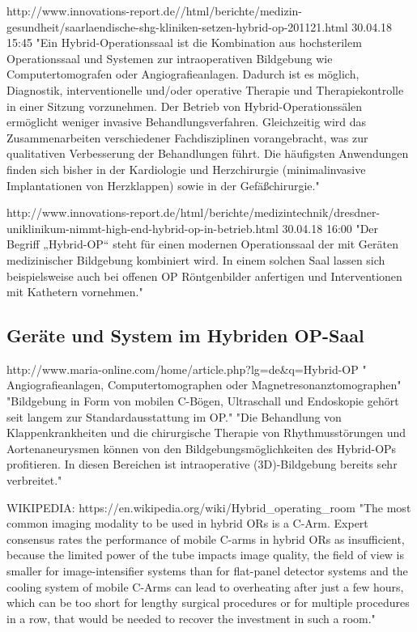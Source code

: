 http://www.innovations-report.de//html/berichte/medizin-gesundheit/saarlaendische-shg-kliniken-setzen-hybrid-op-201121.html 30.04.18 15:45	
	"Ein Hybrid-Operationssaal ist die Kombination aus hochsterilem Operationssaal und Systemen zur intraoperativen Bildgebung wie Computertomografen oder Angiografieanlagen. Dadurch ist es möglich, Diagnostik, interventionelle und/oder operative Therapie und Therapiekontrolle in einer Sitzung vorzunehmen.
	Der Betrieb von Hybrid-Operationssälen ermöglicht weniger invasive Behandlungsverfahren. Gleichzeitig wird das Zusammenarbeiten verschiedener Fachdisziplinen vorangebracht, was zur qualitativen Verbesserung der Behandlungen führt. Die häufigsten Anwendungen finden sich bisher in der Kardiologie und Herzchirurgie (minimalinvasive Implantationen von Herzklappen) sowie in der Gefäßchirurgie."
	
http://www.innovations-report.de/html/berichte/medizintechnik/dresdner-uniklinikum-nimmt-high-end-hybrid-op-in-betrieb.html 30.04.18 16:00
	"Der Begriff „Hybrid-OP“ steht für einen modernen Operationssaal der mit Geräten medizinischer Bildgebung kombiniert wird. In einem solchen Saal lassen sich beispielsweise auch bei offenen OP Röntgenbilder anfertigen und Interventionen mit Kathetern vornehmen."
\subsection{Geräte und System im Hybriden OP-Saal}	
http://www.maria-online.com/home/article.php?lg=de&q=Hybrid-OP
	" Angiografieanlagen, Computertomographen oder Magnetresonanztomographen"
	 "Bildgebung in Form von mobilen C-Bögen, Ultraschall und Endoskopie gehört seit langem zur Standardausstattung im OP."
	 "Die Behandlung von Klappenkrankheiten und die chirurgische Therapie von Rhythmusstörungen und Aortenaneurysmen können von den Bildgebungsmöglichkeiten des Hybrid-OPs profitieren. In diesen Bereichen ist intraoperative (3D)-Bildgebung bereits sehr verbreitet."

WIKIPEDIA: https://en.wikipedia.org/wiki/Hybrid_operating_room
	"The most common imaging modality to be used in hybrid ORs is a C-Arm. Expert consensus rates the performance of mobile C-arms in hybrid ORs as insufficient, because the limited power of the tube impacts image quality, the field of view is smaller for image-intensifier systems than for flat-panel detector systems and the cooling system of mobile C-Arms can lead to overheating after just a few hours, which can be too short for lengthy surgical procedures or for multiple procedures in a row, that would be needed to recover the investment in such a room."
	
